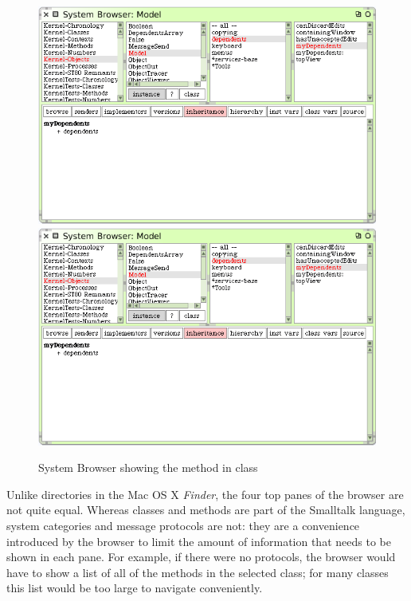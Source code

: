 \documentclass[a4paper,10pt,twoside]{book}
\begin{document}
\begin{figure}[htbp]
   \centering
   \ifluluelse
	   {\includegraphics[width=\textwidth]{SystemBrowserMyDependents}}
	   {\includegraphics[scale=.7]{SystemBrowserMyDependents}}
   \caption{System Browser showing the  method in class 
   \label{fig:SystemBrowserMyDependents}}
\end{figure}

Unlike directories in the Mac OS X \emph{Finder}, the four top panes of the browser are not quite equal.  
Whereas classes and methods are part of the Smalltalk language, system categories and message protocols are not: they are a convenience introduced by the browser to limit the amount of information that needs to be shown in each pane.  For example, if there were no protocols, the browser would have to show a list of all of the methods in the selected class; for many classes this list would be too large to navigate conveniently.  
\end{document}
